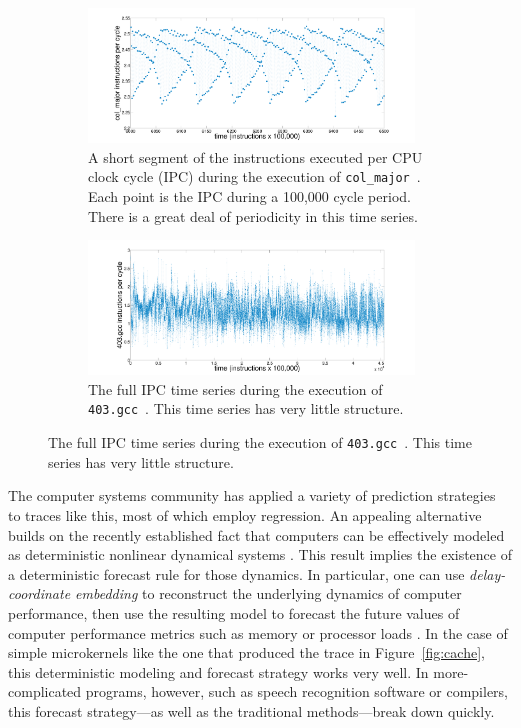 \documentclass{article}
\newcommand{\gcc}{{\tt 403.gcc}~}
\newcommand{\col}{{\tt col\_major}~}
\begin{document}
\begin{figure}[htbp]
  \centering
  \begin{subfigure}[t]{0.475\textwidth}
    \includegraphics[width=0.95\textwidth]{figs/colshortts}
    \caption{A short segment of the instructions executed per CPU clock cycle
    (IPC) during the execution of \col. Each point is the IPC during a 100,000
    cycle period. There is a great deal of periodicity in this time series.}
    \label{fig:col-ts}
  \end{subfigure}%
  \begin{subfigure}[t]{0.475\textwidth}
    \includegraphics[width=0.95\textwidth]{figs/gccfullts}
    \caption{The full IPC time series during the execution of \gcc. This time
    series has very little structure.}
    \label{fig:gcc-ts}
  \end{subfigure}
  \label{fig:sample-ts}
\end{figure}

The computer systems community has applied a variety of prediction
strategies to traces like this, most of which employ regression.  An
appealing alternative builds on the recently established fact that
computers can be effectively modeled as deterministic nonlinear
dynamical systems \cite{mytkowicz09}.  This result implies the
existence of a deterministic forecast rule for those dynamics.  In
particular, one can use \emph{delay-coordinate embedding} to
reconstruct the underlying dynamics of computer performance, then use
the resulting model to forecast the future values of computer
performance metrics such as memory or processor loads
\cite{josh-ida2011}.  In the case of simple microkernels like the one
that produced the trace in Figure~\ref{fig:cache}, this deterministic
modeling and forecast strategy works very well.  In more-complicated
programs, however, such as speech recognition software or compilers,
this forecast strategy---as well as the traditional methods---break
down quickly.
\end{document}
